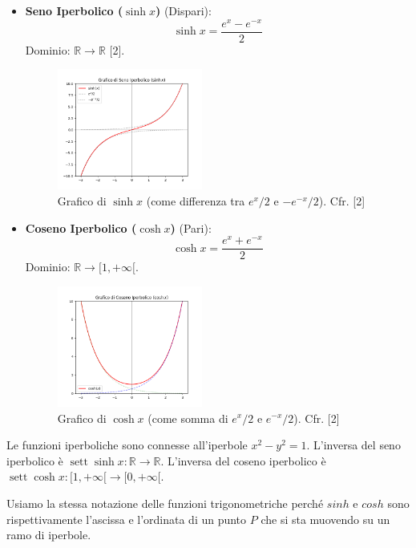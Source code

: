 \begin{itemize}
    \item \textbf{Seno Iperbolico ($\sinh x$)} (Dispari):
    \[ \sinh x = \frac{e^x - e^{-x}}{2} \]
    Dominio: $\mathbb{R} \to \mathbb{R}$ [2].
    
    \begin{figure}[h]
        \centering
        \includegraphics[width=0.45\textwidth]{img/grafico_senh.png} %
        \caption{Grafico di $\sinh x$ (come differenza tra $e^x/2$ e $-e^{-x}/2$). Cfr. [2]}
    \end{figure}

    \item \textbf{Coseno Iperbolico ($\cosh x$)} (Pari):
    \[ \cosh x = \frac{e^x + e^{-x}}{2} \]
    Dominio: $\mathbb{R} \to [1, +\infty[$.

    \begin{figure}[h]
        \centering
        \includegraphics[width=0.45\textwidth]{img/grafico_cosh.png} %
        \caption{Grafico di $\cosh x$ (come somma di $e^x/2$ e $e^{-x}/2$). Cfr. [2]}
    \end{figure}
\end{itemize}
Le funzioni iperboliche sono connesse all'iperbole $x^2 - y^2 = 1$. L'inversa del seno iperbolico è $\operatorname{sett}\sinh x: \mathbb{R} \to \mathbb{R}$. L'inversa del coseno iperbolico è $\operatorname{sett}\cosh x: [1, +\infty[ \to [0, +\infty[$.


  Usiamo la stessa notazione delle funzioni trigonometriche perché $sinh$ e $cosh$ sono rispettivamente l'ascissa e l'ordinata di un punto $P$ che si sta muovendo su un ramo di iperbole.

